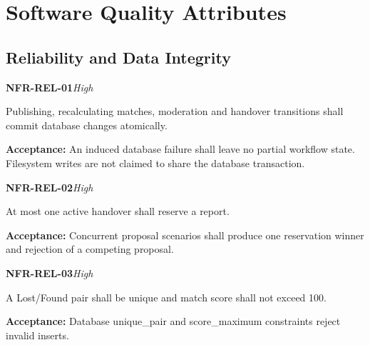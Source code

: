 \documentclass[12pt,a4paper,oneside]{report}
\begin{document}

\section{Software Quality Attributes}


\subsection{Reliability and Data Integrity}

\noindent\begin{minipage}{\linewidth}\textbf{NFR-REL-01}\hfill\textit{High}\par\nopagebreak

Publishing, recalculating matches, moderation and handover transitions shall commit database changes atomically.

{\color{muted}\textbf{Acceptance:} An induced database failure shall leave no partial workflow state. Filesystem writes are not claimed to share the database transaction.\par}\end{minipage}\par\vspace{5pt}

\noindent\begin{minipage}{\linewidth}\textbf{NFR-REL-02}\hfill\textit{High}\par\nopagebreak

At most one active handover shall reserve a report.

{\color{muted}\textbf{Acceptance:} Concurrent proposal scenarios shall produce one reservation winner and rejection of a competing proposal.\par}\end{minipage}\par\vspace{5pt}

\noindent\begin{minipage}{\linewidth}\textbf{NFR-REL-03}\hfill\textit{High}\par\nopagebreak

A Lost/Found pair shall be unique and match score shall not exceed 100.

{\color{muted}\textbf{Acceptance:} Database unique\_pair and score\_maximum constraints reject invalid inserts.\par}\end{minipage}\par\vspace{5pt}
\end{document}
